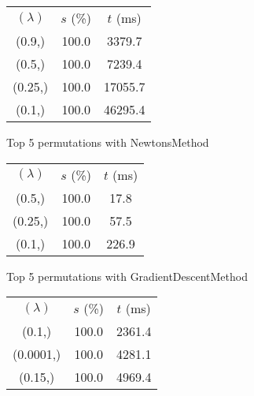 \begin{figure}[H]
\label{fig:param_comp_NegativeEntropy_ConstantSearch}
\begin{subfigure}[ht]{.5\textwidth}
\begin{tabular}{|c|c|c|}
\hline
\rowcolor{gray!25}
\multicolumn{3}{|c|}{NewtonsMethod} \\
\hline
\rowcolor{gray!25}
$(\lambda)$ & $s$ (\%) & $t$ (ms) \\
\hline
(0.9,) & 100.0 & 3379.7 \\
(0.5,) & 100.0 & 7239.4 \\
(0.25,) & 100.0 & 17055.7 \\
(0.1,) & 100.0 & 46295.4 \\
\hline
\end{tabular}
\caption{Top 5 permutations with NewtonsMethod}
\label{subfig:param_comp_NegativeEntropy_NewtonsMethod_ConstantSearch}
\end{subfigure}
\hfill
\begin{subfigure}[ht]{.5\textwidth}
\begin{tabular}{|c|c|c|}
\hline
\rowcolor{gray!25}
\multicolumn{3}{|c|}{GradientDescentMethod} \\
\hline
\rowcolor{gray!25}
$(\lambda)$ & $s$ (\%) & $t$ (ms) \\
\hline
(0.5,) & 100.0 & 17.8 \\
(0.25,) & 100.0 & 57.5 \\
(0.1,) & 100.0 & 226.9 \\
\hline
\end{tabular}
\caption{Top 5 permutations with GradientDescentMethod}
\label{subfig:param_comp_NegativeEntropy_GradientDescentMethod_ConstantSearch}
\end{subfigure}
\hfill
\begin{subfigure}[ht]{.5\textwidth}
\begin{tabular}{|c|c|c|}
\hline
\rowcolor{gray!25}
\multicolumn{3}{|c|}{ConjugateGradientMethod} \\
\hline
\rowcolor{gray!25}
$(\lambda)$ & $s$ (\%) & $t$ (ms) \\
\hline
(0.1,) & 100.0 & 2361.4 \\
(0.0001,) & 100.0 & 4281.1 \\
(0.15,) & 100.0 & 4969.4 \\

\end{tabular}
\end{subfigure}
\end{figure}
